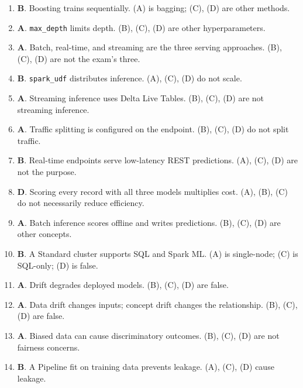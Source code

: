 \documentclass[11pt]{article}
\begin{document}
\begin{enumerate}[leftmargin=*, label=\textbf{Q\arabic*.}]
		\item \textbf{B}. Boosting trains sequentially. (A) is bagging; (C), (D) are other methods.
		
		\item \textbf{A}. \texttt{max\_depth} limits depth. (B), (C), (D) are other hyperparameters.
		
		\item \textbf{A}. Batch, real-time, and streaming are the three serving approaches. (B), (C), (D) are not the exam's three.
		
		\item \textbf{B}. \texttt{spark\_udf} distributes inference. (A), (C), (D) do not scale.
		
		\item \textbf{A}. Streaming inference uses Delta Live Tables. (B), (C), (D) are not streaming inference.
		
		\item \textbf{A}. Traffic splitting is configured on the endpoint. (B), (C), (D) do not split traffic.
		
		\item \textbf{B}. Real-time endpoints serve low-latency REST predictions. (A), (C), (D) are not the purpose.
		
		\item \textbf{D}. Scoring every record with all three models multiplies cost. (A), (B), (C) do not necessarily reduce efficiency.
		
		\item \textbf{A}. Batch inference scores offline and writes predictions. (B), (C), (D) are other concepts.
		
		\item \textbf{B}. A Standard cluster supports SQL and Spark ML. (A) is single-node; (C) is SQL-only; (D) is false.
		
		\item \textbf{A}. Drift degrades deployed models. (B), (C), (D) are false.
		
		\item \textbf{A}. Data drift changes inputs; concept drift changes the relationship. (B), (C), (D) are false.
		
		\item \textbf{A}. Biased data can cause discriminatory outcomes. (B), (C), (D) are not fairness concerns.
		
		\item \textbf{B}. A Pipeline fit on training data prevents leakage. (A), (C), (D) cause leakage.
		
	\end{enumerate}
	
\end{document}
